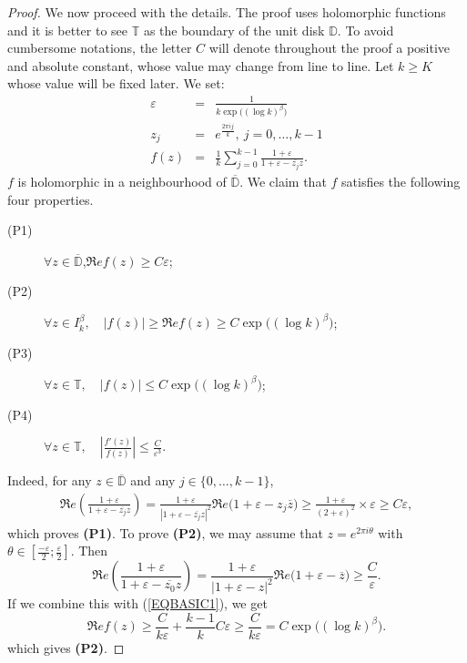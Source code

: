 \documentclass[11pt,a4paper]{amsart}
\theoremstyle{plain}
\begin{document}
\begin{proof}
We now proceed with the details. The proof uses holomorphic functions and it is better to see ${\mathbb T}$ as the boundary of the unit disk ${\mathbb D}$.
To avoid cumbersome notations, the letter $C$ will denote throughout the proof a positive and absolute constant, whose value may change from line to line.
Let $k\geq K$ whose value will be fixed later. We set:
\begin{eqnarray*}
{\varepsilon}&=&\frac1{k\exp\big((\log k)^\beta\big)}\\
z_j&=&e^{\frac{2\pi ij}k},\ j=0,\dots,k-1\\
f(z)&=&\frac1k\sum_{j=0}^{k-1}\frac{1+{\varepsilon}}{1+{\varepsilon}-\overline{z_j}z}.
\end{eqnarray*}
$f$ is holomorphic in a neighbourhood of $\overline{\mathbb D}$. We claim that $f$ satisfies the following four properties.
\begin{description}
\item[(P1)]$\forall z\in\overline{\mathbb D}$,\quad $\Re ef(z)\geq C{\varepsilon}$;
\item[(P2)]$\forall z\in I_k^\beta,\quad |f(z)|\geq\Re ef(z)\geq C\exp\big((\log k)^\beta\big)$;
\item[(P3)]$\forall z\in{\mathbb T},\quad |f(z)|\leq C\exp\big((\log k)^\beta\big)$;
\item[(P4)]$\forall z\in{\mathbb T},\quad \left|\frac{f'(z)}{f(z)}\right|\leq\frac{C}{{\varepsilon}^3}$.
\end{description}
Indeed, for any $z\in\overline{\mathbb D}$ and any $j\in\{0,\dots,k-1\}$,
\begin{eqnarray}\label{EQBASIC1}
\Re e\left(\frac{1+{\varepsilon}}{1+{\varepsilon}-\overline{z_j}z}\right)=\frac{1+{\varepsilon}}{|1+{\varepsilon}-\overline{z_j} z|^2}\Re e\big(1+{\varepsilon}-z_j\overline{z}\big)\geq\frac{1+{\varepsilon}}{(2+{\varepsilon})^2}\times{\varepsilon}\geq C{\varepsilon},
\end{eqnarray}
which proves \textbf{(P1)}. To prove \textbf{(P2)}, we may assume that $z=e^{2\pi i\theta}$ with 
$\theta\in\left[\frac{-{\varepsilon}}{2};\frac{\varepsilon}{2}\right]$. Then 
$$\Re e\left(\frac{1+{\varepsilon}}{1+{\varepsilon}-\overline{z_0}z}\right)=\frac{1+{\varepsilon}}{|1+{\varepsilon}-z|^2}\Re e\big(1+{\varepsilon}-\overline{z}\big)\geq\frac C{\varepsilon}.$$
If we combine this with (\ref{EQBASIC1}), we get 
$$\Re e f(z)\ge \frac{C}{k {\varepsilon}}+\frac{k-1}k C{\varepsilon}\ge \frac{C}{k {\varepsilon}}=C\exp\big((\log k)^\beta\big).$$
which gives \textbf{(P2)}. 


\end{proof}
\end{document}
